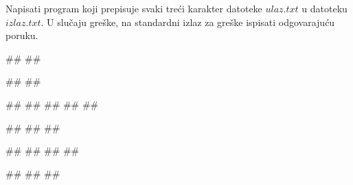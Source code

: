 \begin{Exercise}[label=p3_02] 
Napisati program koji prepisuje svaki treći karakter datoteke $ulaz.txt$ u datoteku $izlaz.txt$.
U slučaju greške, na standardni izlaz za greške ispisati odgovarajuću poruku.

\begin{minitest}
\begin{upotreba}{1}
##
##

##
##
\end{upotreba}
\end{minitest}
\begin{minitest}
\begin{upotreba}{2}
##
##
##
##
##

##
##
##
\end{upotreba}
\end{minitest}
\begin{minitest}
\begin{upotreba}{3}
##
##
##
##

##
##
##
\end{upotreba}
\end{minitest}
\end{Exercise}
\begin{Answer}[ref=p3_02]
\end{Answer}


